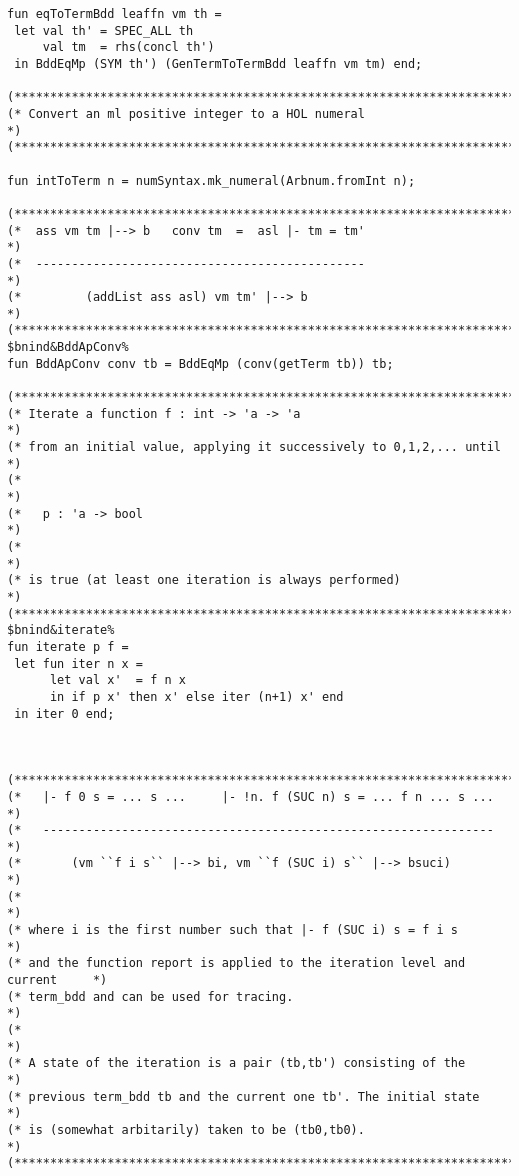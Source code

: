 \documentclass[12pt]{article}
\begin{document}
\begin{footnotesize}
\begin{Verbatim}[commandchars=\$\&\%]
fun eqToTermBdd leaffn vm th =
 let val th' = SPEC_ALL th
     val tm  = rhs(concl th')
 in BddEqMp (SYM th') (GenTermToTermBdd leaffn vm tm) end;

(*****************************************************************************)
(* Convert an ml positive integer to a HOL numeral                           *)
(*****************************************************************************)

fun intToTerm n = numSyntax.mk_numeral(Arbnum.fromInt n);

(*****************************************************************************)
(*  ass vm tm |--> b   conv tm  =  asl |- tm = tm'                           *)
(*  ----------------------------------------------                           *)
(*         (addList ass asl) vm tm' |--> b                                   *)
(*****************************************************************************)
$bnind&BddApConv%
fun BddApConv conv tb = BddEqMp (conv(getTerm tb)) tb;

(*****************************************************************************)
(* Iterate a function f : int -> 'a -> 'a                                    *)
(* from an initial value, applying it successively to 0,1,2,... until        *)
(*                                                                           *)
(*   p : 'a -> bool                                                          *)
(*                                                                           *)
(* is true (at least one iteration is always performed)                      *)
(*****************************************************************************)
$bnind&iterate%
fun iterate p f =
 let fun iter n x =
      let val x'  = f n x
      in if p x' then x' else iter (n+1) x' end
 in iter 0 end;



(*****************************************************************************)
(*   |- f 0 s = ... s ...     |- !n. f (SUC n) s = ... f n ... s ...         *)
(*   ---------------------------------------------------------------         *)
(*       (vm ``f i s`` |--> bi, vm ``f (SUC i) s`` |--> bsuci)               *)
(*                                                                           *)
(* where i is the first number such that |- f (SUC i) s = f i s              *)
(* and the function report is applied to the iteration level and current     *)
(* term_bdd and can be used for tracing.                                     *)
(*                                                                           *)
(* A state of the iteration is a pair (tb,tb') consisting of the             *)
(* previous term_bdd tb and the current one tb'. The initial state           *)
(* is (somewhat arbitarily) taken to be (tb0,tb0).                           *)
(*****************************************************************************)


\end{Verbatim}
\end{footnotesize}
\end{document}
